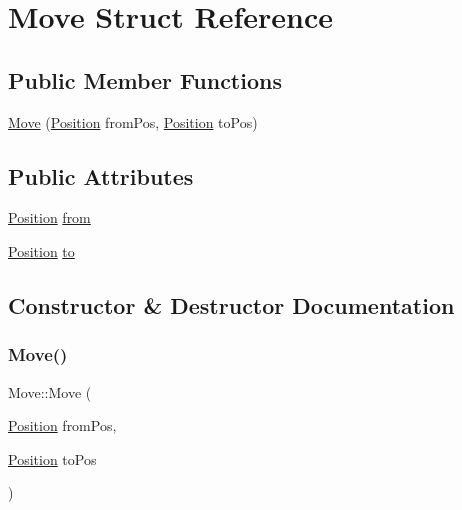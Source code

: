 \hypertarget{struct_move}{}\section{Move Struct Reference}
\label{struct_move}
\subsection*{Public Member Functions}
\begin{DoxyCompactItemize}
\item 
\mbox{\hyperlink{struct_move_a30751f94ab306167b39b648076407532}{Move}} (\mbox{\hyperlink{struct_position}{Position}} from\+Pos, \mbox{\hyperlink{struct_position}{Position}} to\+Pos)
\end{DoxyCompactItemize}
\subsection*{Public Attributes}
\begin{DoxyCompactItemize}
\item 
\mbox{\hyperlink{struct_position}{Position}} \mbox{\hyperlink{struct_move_add76f7fa185380a7a02b6904bf48dc87}{from}}
\item 
\mbox{\hyperlink{struct_position}{Position}} \mbox{\hyperlink{struct_move_a6b0d3fd05bd190244015848d4a1b0aae}{to}}
\end{DoxyCompactItemize}


\subsection{Constructor \& Destructor Documentation}
\mbox{\label{struct_move_a30751f94ab306167b39b648076407532}} 
\subsubsection{\texorpdfstring{Move()}{Move()}}
{\footnotesize\ttfamily Move\+::\+Move (\begin{DoxyParamCaption}\item[{\mbox{\hyperlink{struct_position}{Position}}}]{from\+Pos,  }\item[{\mbox{\hyperlink{struct_position}{Position}}}]{to\+Pos }\end{DoxyParamCaption})\hspace{0.3cm}{\ttfamily [inline]}}


